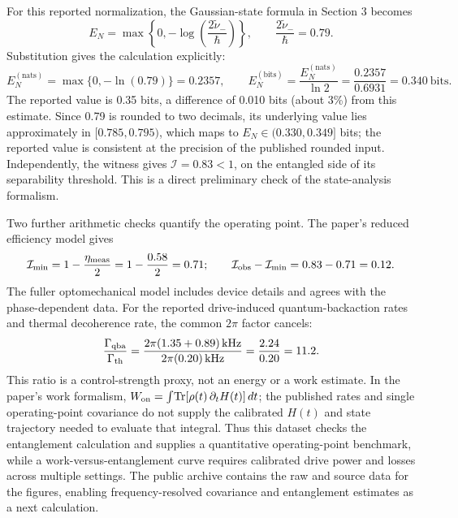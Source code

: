 \documentclass[9pt]{article}
\begin{document}
For this reported normalization, the Gaussian-state formula in Section 3 becomes
\begin{equation}
 E_N=\max\!\left\{0,-\log\!\left(\frac{2\tilde\nu_-}{\hbar}\right)\right\},
 \qquad \frac{2\tilde\nu_-}{\hbar}=0.79.
\end{equation}
Substitution gives the calculation explicitly:
\begin{equation}
 E_N^{(\mathrm{nats})}=\max\{0,-\ln(0.79)\}=0.2357,\qquad
 E_N^{(\mathrm{bits})}=\frac{E_N^{(\mathrm{nats})}}{\ln 2}
 =\frac{0.2357}{0.6931}=0.340\ \mathrm{bits}.
\end{equation}
The reported value is 0.35 bits, a difference of 0.010 bits (about 3\%) from this estimate. Since 0.79 is rounded to two decimals, its underlying value lies approximately in $[0.785,0.795)$, which maps to $E_N\in(0.330,0.349]$ bits; the reported value is consistent at the precision of the published rounded input. Independently, the witness gives $\mathcal I=0.83<1$, on the entangled side of its separability threshold. This is a direct preliminary check of the state-analysis formalism.

Two further arithmetic checks quantify the operating point. The paper's reduced efficiency model gives
\begin{equation}
 \mathcal I_{\min}=1-\frac{\eta_{\rm meas}}{2}
 =1-\frac{0.58}{2}=0.71;\qquad
 \mathcal I_{\rm obs}-\mathcal I_{\min}=0.83-0.71=0.12.
\end{equation}
The fuller optomechanical model includes device details and agrees with the phase-dependent data. For the reported drive-induced quantum-backaction rates and thermal decoherence rate, the common $2\pi$ factor cancels:
\begin{equation}
 \frac{\Gamma_{\rm qba}}{\Gamma_{\rm th}}
 =\frac{2\pi(1.35+0.89)\,{\rm kHz}}{2\pi(0.20)\,{\rm kHz}}
 =\frac{2.24}{0.20}=11.2.
\end{equation}
This ratio is a control-strength proxy, not an energy or a work estimate. In the paper's work formalism, $W_{\rm on}=\int\!\operatorname{Tr}[\rho(t)\,\partial_tH(t)]\,dt$; the published rates and single operating-point covariance do not supply the calibrated $H(t)$ and state trajectory needed to evaluate that integral. Thus this dataset checks the entanglement calculation and supplies a quantitative operating-point benchmark, while a work-versus-entanglement curve requires calibrated drive power and losses across multiple settings. The public archive contains the raw and source data for the figures, enabling frequency-resolved covariance and entanglement estimates as a next calculation.\cite{chen2020}
\end{document}
